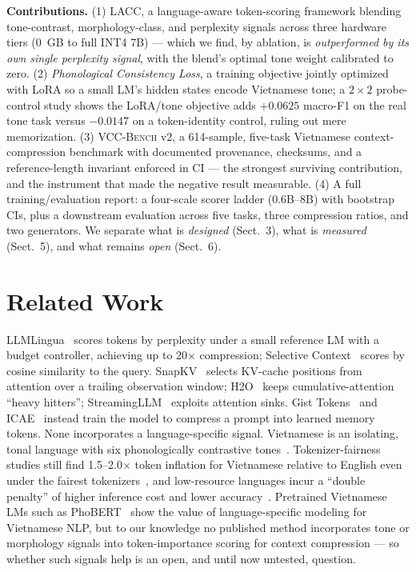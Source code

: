 \documentclass[runningheads]{llncs}
\newcommand{\method}[1]{\textsc{#1}}
\begin{document}
\textbf{Contributions.} (1) \method{LACC}, a language-aware token-scoring framework blending tone-contrast, morphology-class, and perplexity signals across three hardware tiers (0~GB to full INT4 7B) --- which we find, by ablation, is \emph{outperformed by its own single perplexity signal}, with the blend's optimal tone weight calibrated to zero. (2) \emph{Phonological Consistency Loss}, a training objective jointly optimized with LoRA so a small LM's hidden states encode Vietnamese tone; a $2{\times}2$ probe-control study shows the LoRA/tone objective adds $+0.0625$ macro-F1 on the real tone task versus $-0.0147$ on a token-identity control, ruling out mere memorization. (3) \method{VCC-Bench} v2, a 614-sample, five-task Vietnamese context-compression benchmark with documented provenance, checksums, and a reference-length invariant enforced in CI --- the strongest surviving contribution, and the instrument that made the negative result measurable. (4) A full training/evaluation report: a four-scale scorer ladder (0.6B--8B) with bootstrap CIs, plus a downstream evaluation across five tasks, three compression ratios, and two generators. We separate what is \emph{designed} (Sect.~3), what is \emph{measured} (Sect.~5), and what remains \emph{open} (Sect.~6).


\section{Related Work}

LLMLingua~\cite{jiang2023llmlingua} scores tokens by perplexity under a small reference LM with a budget controller, achieving up to 20$\times$ compression; Selective Context~\cite{li2023selective} scores by cosine similarity to the query. SnapKV~\cite{li2024snapkv} selects KV-cache positions from attention over a trailing observation window; H2O~\cite{zhang2023h2o} keeps cumulative-attention ``heavy hitters''; StreamingLLM~\cite{xiao2024streamingllm} exploits attention sinks. Gist Tokens~\cite{mu2023gist} and ICAE~\cite{ge2024icae} instead train the model to compress a prompt into learned memory tokens. None incorporates a language-specific signal. Vietnamese is an isolating, tonal language with six phonologically contrastive tones~\cite{nguyen1997vietnamese}. Tokenizer-fairness studies still find 1.5--2.0$\times$ token inflation for Vietnamese relative to English even under the fairest tokenizers~\cite{lee2026equity}, and low-resource languages incur a ``double penalty'' of higher inference cost and lower accuracy~\cite{deng2026language}. Pretrained Vietnamese LMs such as PhoBERT~\cite{nguyen2020phobert} show the value of language-specific modeling for Vietnamese NLP, but to our knowledge no published method incorporates tone or morphology signals into token-importance scoring for context compression --- so whether such signals help is an open, and until now untested, question.
\end{document}
